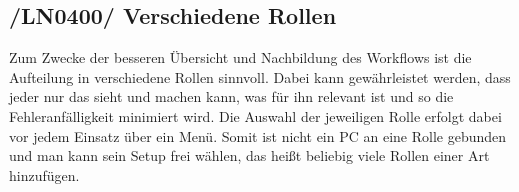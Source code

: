 \subsection{/LN0400/ Verschiedene Rollen}
Zum Zwecke der besseren Übersicht und Nachbildung des Workflows ist die Aufteilung in verschiedene Rollen sinnvoll.  
Dabei kann gewährleistet werden, dass jeder nur das sieht und machen kann, was für ihn relevant ist und so die Fehleranfälligkeit minimiert wird. 
Die Auswahl der jeweiligen Rolle erfolgt dabei vor jedem Einsatz über ein Menü. Somit ist nicht ein PC an eine Rolle gebunden und man kann sein Setup frei wählen, das heißt beliebig viele Rollen einer Art hinzufügen.
